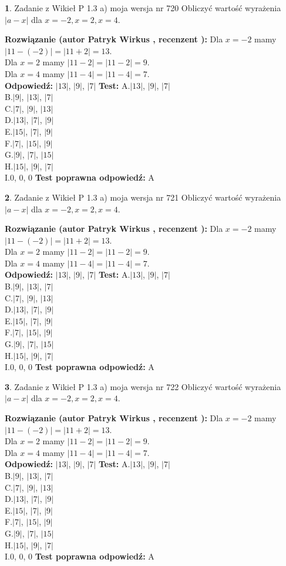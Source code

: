 \documentclass[12pt, a4paper]{article}
\theoremstyle{definition} %
\newtheorem{zad}{}
\newcommand{\zadStart}[1]{\begin{zad}#1\newline}
\newcommand{\zadStop}{\end{zad}}
\newcommand{\rozwStart}[2]{\noindent \textbf{Rozwiązanie (autor #1 , recenzent #2): }\newline}
\newcommand{\rozwStop}{\newline}
\newcommand{\odpStart}{\noindent \textbf{Odpowiedź:}\newline}
\newcommand{\odpStop}{\newline}
\newcommand{\testStart}{\noindent \textbf{Test:}\newline}
\newcommand{\testStop}{\newline}
\newcommand{\kluczStart}{\noindent \textbf{Test poprawna odpowiedź:}\newline}
\newcommand{\kluczStop}{\newline}
\begin{document}
\zadStart{Zadanie z Wikieł P 1.3 a) moja wersja nr 720}
Obliczyć wartość wyrażenia $|a - x|$ dla $x=-2,x=2,x=4$.
\zadStop
\rozwStart{Patryk Wirkus}{}
Dla $x = -2$ mamy $|11 - (-2)| = |11 + 2| = 13$.\\
Dla $x = 2$ mamy $|11 - 2| = |11 - 2| = 9$.\\
Dla $x = 4$ mamy $|11 - 4| = |11 - 4| = 7$.\\
\rozwStop
\odpStart
$|13|$, $|9|$, $|7|$
\odpStop
\testStart
A.$|13|$, $|9|$, $|7|$\\
B.$|9|$, $|13|$, $|7|$\\
C.$|7|$, $|9|$, $|13|$\\
D.$|13|$, $|7|$, $|9|$\\
E.$|15|$, $|7|$, $|9|$\\
F.$|7|$, $|15|$, $|9|$\\
G.$|9|$, $|7|$, $|15|$\\
H.$|15|$, $|9|$, $|7|$\\
I.$0$, $0$, $0$
\testStop
\kluczStart
A
\kluczStop



\zadStart{Zadanie z Wikieł P 1.3 a) moja wersja nr 721}
Obliczyć wartość wyrażenia $|a - x|$ dla $x=-2,x=2,x=4$.
\zadStop
\rozwStart{Patryk Wirkus}{}
Dla $x = -2$ mamy $|11 - (-2)| = |11 + 2| = 13$.\\
Dla $x = 2$ mamy $|11 - 2| = |11 - 2| = 9$.\\
Dla $x = 4$ mamy $|11 - 4| = |11 - 4| = 7$.\\
\rozwStop
\odpStart
$|13|$, $|9|$, $|7|$
\odpStop
\testStart
A.$|13|$, $|9|$, $|7|$\\
B.$|9|$, $|13|$, $|7|$\\
C.$|7|$, $|9|$, $|13|$\\
D.$|13|$, $|7|$, $|9|$\\
E.$|15|$, $|7|$, $|9|$\\
F.$|7|$, $|15|$, $|9|$\\
G.$|9|$, $|7|$, $|15|$\\
H.$|15|$, $|9|$, $|7|$\\
I.$0$, $0$, $0$
\testStop
\kluczStart
A
\kluczStop



\zadStart{Zadanie z Wikieł P 1.3 a) moja wersja nr 722}
Obliczyć wartość wyrażenia $|a - x|$ dla $x=-2,x=2,x=4$.
\zadStop
\rozwStart{Patryk Wirkus}{}
Dla $x = -2$ mamy $|11 - (-2)| = |11 + 2| = 13$.\\
Dla $x = 2$ mamy $|11 - 2| = |11 - 2| = 9$.\\
Dla $x = 4$ mamy $|11 - 4| = |11 - 4| = 7$.\\
\rozwStop
\odpStart
$|13|$, $|9|$, $|7|$
\odpStop
\testStart
A.$|13|$, $|9|$, $|7|$\\
B.$|9|$, $|13|$, $|7|$\\
C.$|7|$, $|9|$, $|13|$\\
D.$|13|$, $|7|$, $|9|$\\
E.$|15|$, $|7|$, $|9|$\\
F.$|7|$, $|15|$, $|9|$\\
G.$|9|$, $|7|$, $|15|$\\
H.$|15|$, $|9|$, $|7|$\\
I.$0$, $0$, $0$
\testStop
\kluczStart
A
\kluczStop
\end{document}
